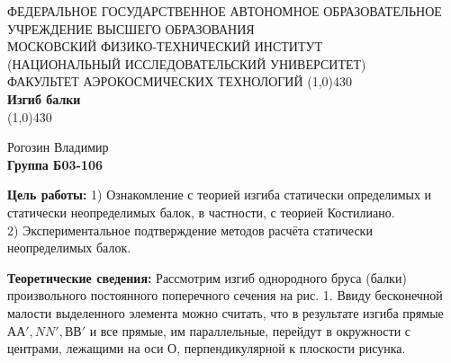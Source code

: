 \documentclass[a4paper,12pt]{article}
\begin{document}
\begin{titlepage}
\begin{center}
\large{\small ФЕДЕРАЛЬНОЕ ГОСУДАРСТВЕННОЕ АВТОНОМНОЕ ОБРАЗОВАТЕЛЬНОЕ\\ УЧРЕЖДЕНИЕ ВЫСШЕГО ОБРАЗОВАНИЯ \\ МОСКОВСКИЙ ФИЗИКО-ТЕХНИЧЕСКИЙ ИНСТИТУТ\\ (НАЦИОНАЛЬНЫЙ ИССЛЕДОВАТЕЛЬСКИЙ УНИВЕРСИТЕТ)\\ ФАКУЛЬТЕТ АЭРОКОСМИЧЕСКИХ ТЕХНОЛОГИЙ}
\vfill
\line(1,0){430}\\[1mm]
\huge\textbf{Изгиб балки}\\
\line(1,0){430}\\[1mm]
\vfill
\begin{flushright}
\normalsize{Рогозин Владимир}\\
\normalsize{\textbf{Группа Б03-106}}\\
\end{flushright}
\end{center}
\end{titlepage}

\textbf{Цель работы:} 
1) Ознакомление с теорией изгиба статически определимых и статически неопределимых балок, в частности, с теорией Костилиано.\\
2) Экспериментальное подтверждение методов расчёта статически неопределимых балок.

\textbf{Теоретические сведения:} 
Рассмотрим изгиб однородного бруса (балки) произвольного постоянного поперечного сечения на рис. 1. Ввиду бесконечной малости выделенного элемента можно считать, что в результате изгиба прямые $АА', NN', ВВ'$ и все прямые, им параллельные, перейдут в окружности с центрами, лежащими на оси О, перпендикулярной к плоскости рисунка.
\end{document}
